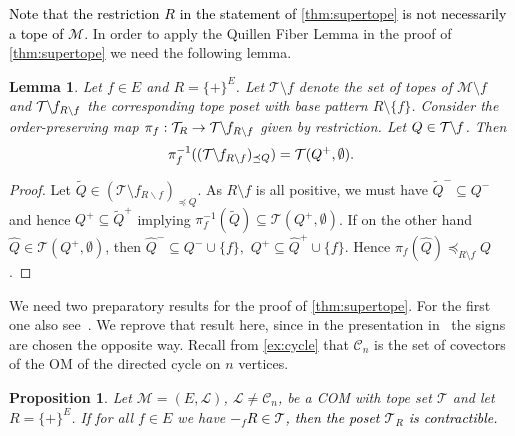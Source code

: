 \documentclass[12pt]{amsart}
\def\Cscr{\mathcal C}
\def\Tscr{{\mathcal T}}
\def\M{{\mathcal M}}
\theoremstyle{plain}
\newtheorem{Lemma}{Lemma}
\numberwithin{Lemma}{\DefaultNumberTheoremWithin}
\numberwithin{Claim}{\DefaultNumberTheoremWithin}
\numberwithin{Theorem}{\DefaultNumberTheoremWithin}
\numberwithin{Corollary}{\DefaultNumberTheoremWithin}
\newtheorem{Proposition}{Proposition}
\numberwithin{Proposition}{\DefaultNumberTheoremWithin}
\numberwithin{Conjecture}{\DefaultNumberTheoremWithin}
\numberwithin{Situation}{\DefaultNumberTheoremWithin}
\numberwithin{Note}{\DefaultNumberTheoremWithin}
\theoremstyle{definition}
\numberwithin{Definition}{\DefaultNumberTheoremWithin}
\theoremstyle{definition}
\numberwithin{Question}{\DefaultNumberTheoremWithin}
\theoremstyle{definition}
\numberwithin{Problem}{\DefaultNumberTheoremWithin}
\theoremstyle{remark} \newtheorem{Remark}{Remark}
\numberwithin{Remark}{\DefaultNumberTheoremWithin}
\theoremstyle{remark}
\numberwithin{Example}{\DefaultNumberTheoremWithin}
\numberwithin{Case}{Lemma}
\numberwithin{Step}{Lemma}
\newcommand{\new}[1]{\textcolor{black}{#1}}
\begin{document}
\new{Note that the restriction $R$ in the statement of  \ref{thm:supertope} is not necessarily a tope of $\M$.} In order to apply the Quillen Fiber Lemma in the proof of \ref{thm:supertope}
we need the following lemma. 

\begin{Lemma}
  \label{lem:fiberisst} Let $f \in E$ and $R=\{+\}^E$. Let $\Tscr\setminus f$
  denote the set of topes of $\M \setminus f$ and
  $\Tscr\hspace{-.1cm}\setminus \hspace{-.1cm}f_{R\setminus f}$ the corresponding tope poset with base pattern $R\setminus \{f\}$. Consider the order-preserving map $\pi_{f}:\Tscr_R \to \Tscr\hspace{-.1cm}\setminus \hspace{-.1cm}f_{R\setminus f}$ given by restriction.  Let $Q \in \Tscr\hspace{-.1cm}\setminus \hspace{-.1cm}f$. Then
  \[\pi_{f}^{-1}((\Tscr\hspace{-.1cm}\setminus \hspace{-.1cm}f_{R\setminus f})_{\preceq Q})=\Tscr(Q^+,\emptyset).\]
\end{Lemma}
\begin{proof}
  Let $\tilde Q \in (\Tscr\setminus f_{R \backslash f})_{\preceq Q}$.  As $R\setminus f$ is all
  positive, we must have $\tilde Q^- \subseteq Q^-$ and hence $Q^+
   \subseteq \tilde Q^+$ implying $\pi_{f}^{-1}(\tilde Q)
  \subseteq \Tscr(Q^+,\emptyset)$.
If on the other
  hand  $\hat Q \in \Tscr(Q^+,\emptyset)$, then
  $\hat Q^- \subseteq Q^-\cup\{f\},$ $Q^+
  \subseteq \hat Q^+\cup \{f\}$. Hence  $\pi_f(\hat Q) \preceq_{R\setminus f} Q$.
\end{proof}

We need two preparatory results for the proof of \ref{thm:supertope}. For the first one also see~\cite[Lemma 10]{HKK}. We reprove that result here, since in the presentation in~\cite{HKK} the signs are chosen the opposite way.  Recall from \ref{ex:cycle} that $\Cscr_n$ is the set of covectors of the OM of the directed cycle on $n$ vertices. 

\begin{Proposition}\label{lem:supertope}
Let $\M=(E,\mathcal{L})$, $\mathcal{L} \neq \mathcal{C}_n$, be a COM with tope set $\Tscr$ and let $R=\{+\}^E$. If for all $f\in E$ we have \new{$-_{f}R\in\Tscr$, then the poset $\Tscr_{R}$ is contractible.}
\end{Proposition}
\end{document}
